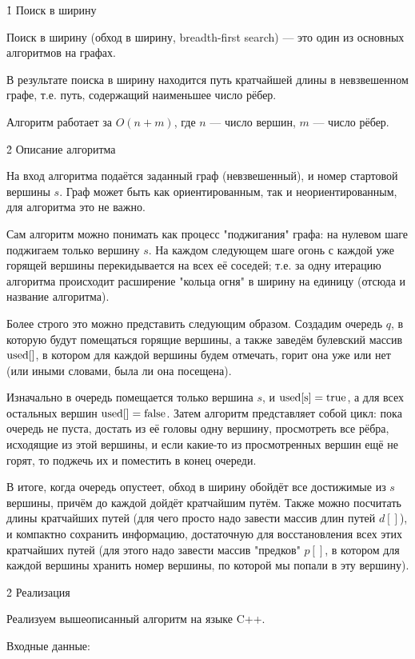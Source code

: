 \h1{ Поиск в ширину }

Поиск в ширину (обход в ширину, breadth-first search) --- это один из основных алгоритмов на графах.

В результате поиска в ширину находится путь кратчайшей длины в невзвешенном графе, т.е. путь, содержащий наименьшее число рёбер.

Алгоритм работает за $O (n+m)$, где $n$ --- число вершин, $m$ --- число рёбер.


\h2{ Описание алгоритма }

На вход алгоритма подаётся заданный граф (невзвешенный), и номер стартовой вершины $s$. Граф может быть как ориентированным, так и неориентированным, для алгоритма это не важно.

Сам алгоритм можно понимать как процесс "поджигания" графа: на нулевом шаге поджигаем только вершину $s$. На каждом следующем шаге огонь с каждой уже горящей вершины перекидывается на всех её соседей; т.е. за одну итерацию алгоритма происходит расширение "кольца огня" в ширину на единицу (отсюда и название алгоритма).

Более строго это можно представить следующим образом. Создадим очередь $q$, в которую будут помещаться горящие вершины, а также заведём булевский массив $\rm used[]$, в котором для каждой вершины будем отмечать, горит она уже или нет (или иными словами, была ли она посещена).

Изначально в очередь помещается только вершина $s$, и $\rm used[s] = true$, а для всех остальных вершин $\rm used[] = false$. Затем алгоритм представляет собой цикл: пока очередь не пуста, достать из её головы одну вершину, просмотреть все рёбра, исходящие из этой вершины, и если какие-то из просмотренных вершин ещё не горят, то поджечь их и поместить в конец очереди.

В итоге, когда очередь опустеет, обход в ширину обойдёт все достижимые из $s$ вершины, причём до каждой дойдёт кратчайшим путём. Также можно посчитать длины кратчайших путей (для чего просто надо завести массив длин путей $d[]$), и компактно сохранить информацию, достаточную для восстановления всех этих кратчайших путей (для этого надо завести массив "предков" $p[]$, в котором для каждой вершины хранить номер вершины, по которой мы попали в эту вершину).


\h2{ Реализация }

Реализуем вышеописанный алгоритм на языке C++.

Входные данные:

\code

